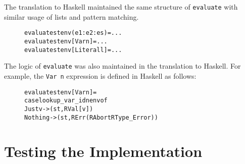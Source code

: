 The translation to Haskell maintained the same structure of \texttt{evaluate}
with similar usage of lists and pattern matching.

\begin{figure}[H]
\begin{alltt}
  evaluate st env (e1:e2:es)  = ...
  evaluate st env [Var n]     = ...
  evaluate st env [Literal l] = ...
\end{alltt}
\end{figure}

\noindent The logic of \texttt{evaluate} was also maintained in the translation
to Haskell. For example, the \texttt{Var n} expression is defined in Haskell as
follows:

\begin{figure}[H]
\begin{alltt}
  evaluate st env [Var n] =
    case lookup_var_id n env of
      Just v  -> (st, RVal [v])
      Nothing -> (st, RErr (RAbort RType_Error))
\end{alltt}
\end{figure}

\section{Testing the Implementation}

